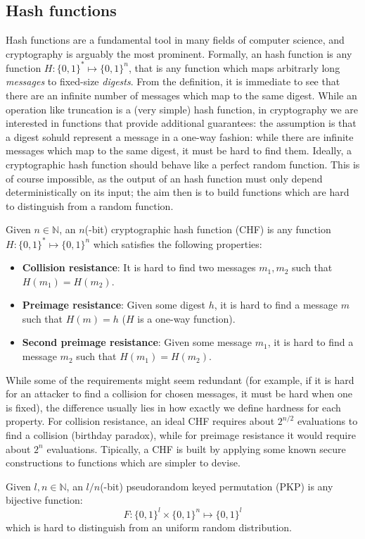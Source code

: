 \subsection{Hash functions}
Hash functions are a fundamental tool in many fields of computer science, and cryptography is
arguably the most prominent.
Formally, an hash function is any function \(H\colon {\{0, 1\}}^{*} \mapsto {\{0, 1\}}^n\), that
is any function which maps arbitrarly long \emph{messages} to fixed-size \emph{digests}.
From the definition, it is immediate to see that there are an infinite number of messages which map
to the same digest.
While an operation like truncation is a (very simple) hash function, in cryptography we are
interested in functions that provide additional guarantees: the assumption is that a digest sohuld
represent a message in a one-way fashion: while there are infinite messages which map to the same
digest, it must be hard to find them.
Ideally, a cryptographic hash function should behave like a perfect random function.
This is of course impossible, as the output of an hash function must only depend deterministically
on its input; the aim then is to build functions which are hard to distinguish from a random
function.
\begin{definition}
	Given \(n \in \mathbb{N}\), an \(n\)(-bit) cryptographic hash function (CHF) is any function
	\(H\colon {\{0, 1\}}^{*} \mapsto {\{0, 1\}}^n\) which satisfies the following properties:
	\begin{itemize}
		\item \textbf{Collision resistance}: It is hard to find two messages \(m_1, m_2\) such
		      that \(H(m_1) = H(m_2)\).
		\item \textbf{Preimage resistance}: Given some digest \(h\), it is hard to find a
		      message \(m\) such that \(H(m) = h\) (\(H\) is a one-way function).
		\item \textbf{Second preimage resistance}: Given some message \(m_1\), it is hard to
		      find a message \(m_2\) such that \(H(m_1) = H(m_2)\).
	\end{itemize}
\end{definition}

\noindent While some of the requirements might seem redundant (for example, if it is hard for an
attacker to find a collision for chosen messages, it must be hard when one is fixed),
the difference usually lies in how exactly we define hardness for each property.
For collision resistance, an ideal CHF requires about \(2^{n/2}\) evaluations to find a collision
(birthday paradox), while for preimage resistance it would require about \(2^n\) evaluations.
Tipically, a CHF is built by applying some known secure constructions to functions which are
simpler to devise.
\begin{definition}
	Given \(l, n \in \mathbb{N}\), an \(l/n\)(-bit) pseudorandom keyed permutation (PKP) is any 
	bijective function:
	\[F\colon {\{0, 1\}}^l \times {\{0, 1\}}^n \mapsto {\{0, 1\}}^l\]
	which is hard to distinguish from an uniform random distribution.
\end{definition}

